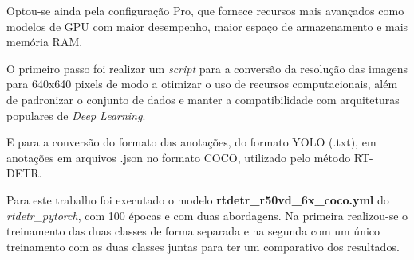 Optou-se ainda pela configuração Pro, que fornece recursos mais avançados como modelos de GPU com maior desempenho, maior espaço de armazenamento e mais memória RAM.


O primeiro passo foi realizar um \textit{script} para a conversão da resolução das imagens para 640x640 pixels de modo a otimizar o uso de recursos computacionais, além de padronizar o conjunto de dados e manter a compatibilidade com arquiteturas populares de \textit{Deep Learning}.

E para a conversão do formato das anotações, do formato YOLO (.txt), em anotações em arquivos .json no formato COCO, utilizado pelo método RT-DETR.


Para este trabalho foi executado o modelo \textbf{rtdetr\_r50vd\_6x\_coco.yml} do \textit{rtdetr\_pytorch}, com 100 épocas e com duas abordagens. Na primeira realizou-se o treinamento das duas classes de forma separada e na segunda com um único treinamento com as duas classes juntas para ter um comparativo dos resultados.

